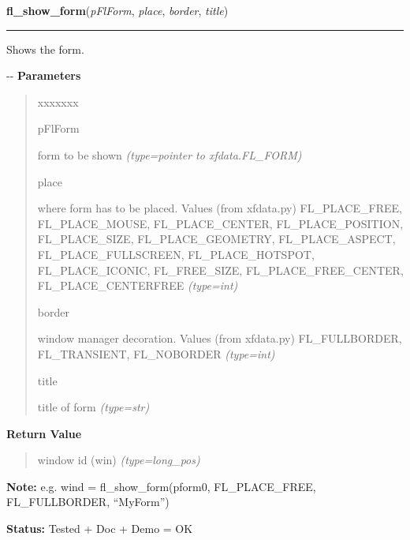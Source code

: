     \label{xformslib:flbasic:fl_show_form}

    \vspace{0.5ex}

\hspace{.8\funcindent}\begin{boxedminipage}{\funcwidth}

    \raggedright \textbf{fl\_show\_form}(\textit{pFlForm}, \textit{place}, \textit{border}, \textit{title})

    \vspace{-1.5ex}

    \rule{\textwidth}{0.5\fboxrule}
\setlength{\parskip}{2ex}

Shows the form.

-{}-
\setlength{\parskip}{1ex}
      \textbf{Parameters}
      \vspace{-1ex}

      \begin{quote}
        \begin{Ventry}{xxxxxxx}

          \item[pFlForm]


form to be shown
            {\it (type=pointer to xfdata.FL\_FORM)}

          \item[place]


where form has to be placed. Values (from xfdata.py) FL\_PLACE\_FREE,
FL\_PLACE\_MOUSE, FL\_PLACE\_CENTER, FL\_PLACE\_POSITION, FL\_PLACE\_SIZE,
FL\_PLACE\_GEOMETRY, FL\_PLACE\_ASPECT, FL\_PLACE\_FULLSCREEN,
FL\_PLACE\_HOTSPOT, FL\_PLACE\_ICONIC, FL\_FREE\_SIZE, FL\_PLACE\_FREE\_CENTER,
FL\_PLACE\_CENTERFREE
            {\it (type=int)}

          \item[border]


window manager decoration. Values (from xfdata.py) FL\_FULLBORDER,
FL\_TRANSIENT, FL\_NOBORDER
            {\it (type=int)}

          \item[title]


title of form
            {\it (type=str)}

        \end{Ventry}

      \end{quote}

      \textbf{Return Value}
    \vspace{-1ex}

      \begin{quote}

window id (win)
      {\it (type=long\_pos)}

      \end{quote}

\textbf{Note:} 
e.g. wind = fl\_show\_form(pform0, FL\_PLACE\_FREE, FL\_FULLBORDER,
``MyForm'')


\textbf{Status:} 
Tested + Doc + Demo = OK


    \end{boxedminipage}


